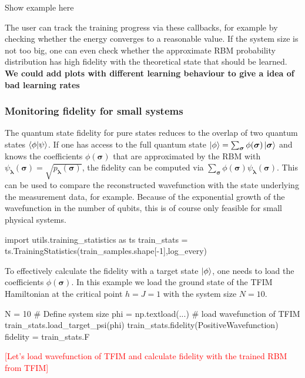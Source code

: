 \documentclass[submission, Phys]{SciPost}
\begin{document}
\begin{python}
	Show example here
\end{python}

The user can track the training progress via these callbacks, for example by checking whether the energy converges to a reasonable value.
If the system size is not too big, one can even check whether the approximate RBM probability distribution has high fidelity with the theoretical state that should be learned.
\textbf{We could add plots with different learning behaviour to give a idea of bad learning rates}



\subsubsection{Monitoring fidelity for small systems}
The quantum state fidelity for pure states reduces to the overlap of two quantum states $\braket{\phi | \psi}$.
If one has access to the full quantum state $\ket{\phi} = \sum_{\bm{\sigma}} \phi(\bm{\sigma}) \ket{ \bm{\sigma}}$
and knows the coefficients $\phi(\bm{\sigma})$ that are approximated by the RBM with
$\psi_{\bm{\lambda}}(\bm{\sigma}) = \sqrt{p_{\bm{\lambda}}(\bm{\sigma})}$,
the fidelity can be computed via $\sum_{\bm{\sigma}} \phi(\bm{\sigma}) \psi_{\bm{\lambda}}(\bm{\sigma})$.
This can be used to compare the reconstructed wavefunction with the state underlying the measurement data, for example.
Because of the exponential growth of the wavefunction in the number of qubits, this is of course only feasible for small physical systems.
\begin{python}
    import utils.training_statistics as ts
    train_stats = ts.TrainingStatistics(train_samples.shape[-1],log_every)
\end{python}
%
To effectively calculate the fidelity with a target state $\ket{\phi}$, one needs to load the coefficients $\phi(\bm{\sigma})$. In this example we load the ground state of the TFIM Hamiltonian at the critical point $h = J = 1$ with the system size $N=10$.

\begin{python}
    N = 10 # Define system size
    phi = np.textload(...) # load wavefunction of TFIM
    train_stats.load_target_psi(phi)
    train_stats.fidelity(PositiveWavefunction)
    fidelity = train_stats.F
\end{python}

\textcolor{red}{[Let's load wavefunction of TFIM and calculate fidelity with the trained RBM from TFIM]}
\end{document}
